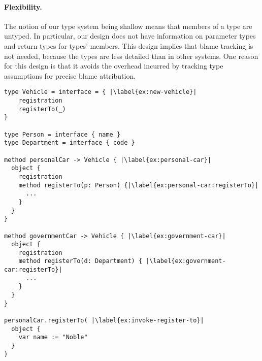 \paragraph{Flexibility.}

The notion of our type system being shallow means 
that members of a type are untyped.
In particular, our design does not have information on parameter types
and return types for types' members.
This design implies that blame tracking is not needed,
because the types are less detailed than in other systems.
One reason for this design is that it avoids the overhead incurred
by tracking type assumptions for precise blame attribution.


\begin{lstlisting}[caption={A program in development with a well-typed execution.},escapechar=|,label={ex:complex},float,floatplacement=htb]
type Vehicle = interface = { |\label{ex:new-vehicle}|
    registration
    registerTo(_)
}

type Person = interface { name }
type Department = interface { code }

method personalCar -> Vehicle { |\label{ex:personal-car}|
  object {
    registration
    method registerTo(p: Person) {|\label{ex:personal-car:registerTo}|
      ...
    } 
  }
}

method governmentCar -> Vehicle { |\label{ex:government-car}|
  object {
    registration
    method registerTo(d: Department) { |\label{ex:government-car:registerTo}|
      ...
    }
  }
}

personalCar.registerTo( |\label{ex:invoke-register-to}|
  object {
    var name := "Noble"
  }
)
\end{lstlisting}


